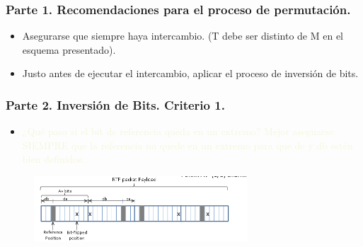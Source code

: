 \documentclass[10pt,fleqn]{beamer}
\begin{document}
\begin{frame}[fragile]
\frametitle{Parte 1. Recomendaciones para el proceso de permutación.  }

\begin{itemize}
\item Asegurarse que siempre haya intercambio. (T debe ser distinto de M en el esquema presentado).

\item Justo antes de ejecutar el intercambio, aplicar el proceso de inversión de bits.

\end{itemize}

\end{frame}





{
\begin{frame}
\frametitle{   Parte 2. Inversión de Bits. Criterio 1.   }

\begin{itemize}
\item  \textcolor{beige}{¿Qué pasa si el bit de referencia queda en un extremo? 
Mejor aseguarse SIEMPRE que la referencia no quede en un extremo para que de y db estén bien definidos.} 



\end{itemize}

\begin{figure}[H]
\centering
\includegraphics[width=8cm]{logos/es1.png}
\end{figure}
\end{frame}
}
\end{document}
